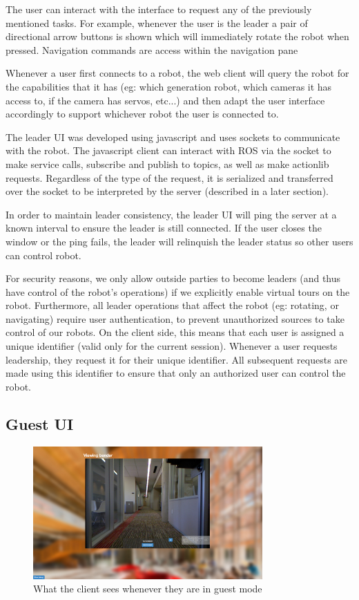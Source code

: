 \documentclass[
  oneside,
  11pt, a4paper,
  footinclude=true,
  headinclude=true,
  cleardoublepage=empty
]{article}
\begin{document}
The user can interact with the interface to request any of the previously
mentioned tasks. For example, whenever the user is the leader a pair of
directional arrow buttons is shown which will immediately rotate the robot when
pressed. Navigation commands are access within the navigation pane

Whenever a user first connects to a robot, the web client will query the robot
for the capabilities that it has (eg: which generation robot, which cameras it
has access to, if the camera has servos, etc...) and then adapt the user
interface accordingly to support whichever robot the user is connected to.

The leader UI was developed using javascript and uses sockets to
communicate with the robot. The javascript client can interact with ROS via the
socket to make service calls, subscribe and publish to topics, as well as make
actionlib requests. Regardless of the type of the request, it is serialized and
transferred over the socket to be interpreted by the server (described in a
later section).

In order to maintain leader consistency, the leader UI will ping the server at
a known interval to ensure the leader is still connected. If the user closes
the window or the ping fails, the leader will relinquish the leader status so
other users can control robot.

For security reasons, we only allow outside parties to become leaders (and thus
have control of the robot's operations) if we explicitly enable virtual tours
on the robot. Furthermore, all leader operations that affect the robot (eg:
rotating, or navigating) require user authentication, to prevent unauthorized
sources to take control of our robots. On the client side, this means that each
user is assigned a unique identifier (valid only for the current session).
Whenever a user requests leadership, they request it for their unique
identifier. All subsequent requests are made using this identifier to ensure
that only an authorized user can control the robot.

\subsection{Guest UI}

\begin{figure}
\centering
\includegraphics[height=2in]{guestUI}
\caption{What the client sees whenever they are in guest mode}
\end{figure}
\end{document}
